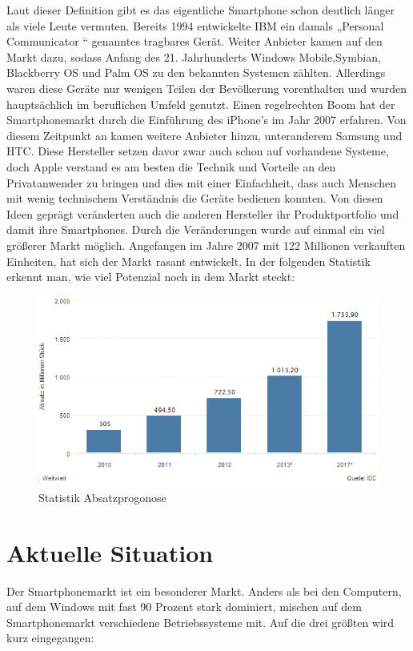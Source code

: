 Laut dieser Definition gibt es das eigentliche Smartphone schon deutlich länger als viele Leute vermuten. Bereits 1994 entwickelte IBM ein damals „Personal Communicator “ genanntes tragbares Gerät. Weiter Anbieter kamen auf den Markt dazu, sodass Anfang des 21. Jahrhunderts Windows Mobile,Symbian, Blackberry OS und Palm OS zu den bekannten Systemen zählten. Allerdings waren diese Geräte nur wenigen Teilen der Bevölkerung vorenthalten  und wurden hauptsächlich im beruflichen Umfeld genutzt. Einen regelrechten Boom hat der Smartphonemarkt durch die Einführung des iPhone’s im Jahr 2007 erfahren. Von diesem Zeitpunkt an kamen weitere Anbieter hinzu, unteranderem Samsung und HTC. Diese Hersteller setzen davor zwar auch schon auf vorhandene Systeme, doch Apple verstand es am besten die Technik und Vorteile an den Privatanwender zu bringen und dies mit einer Einfachheit, dass auch Menschen mit wenig technischem Verständnis die Geräte bedienen konnten. Von diesen Ideen geprägt veränderten auch die anderen Hersteller ihr Produktportfolio und damit ihre Smartphones. Durch die Veränderungen wurde auf einmal ein viel größerer Markt möglich. Angefangen im Jahre 2007 mit 122 Millionen verkauften Einheiten, hat sich der Markt rasant entwickelt. In der folgenden Statistik erkennt man, wie viel Potenzial noch in dem Markt steckt: 

\begin{figure}[H]
\centering
\includegraphics[width=0.7\linewidth]{../images/statista1.png}
\caption{Statistik Absatzprogonose}
\label{fig:statista1}
\end{figure}

\section{Aktuelle Situation}

Der Smartphonemarkt ist ein besonderer Markt. Anders als bei den Computern, auf dem Windows mit fast 90 Prozent 
 stark dominiert, mischen auf dem Smartphonemarkt verschiedene Betriebssysteme mit. Auf die drei größten wird kurz eingegangen:

